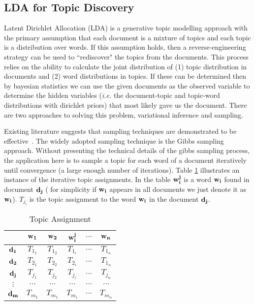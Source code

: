 \documentclass{article}
\begin{document}
\subsection{LDA for Topic Discovery} 
Latent Dirichlet Allocation (LDA) is a generative topic modelling approach with the primary assumption that each document is a mixture of topics and each topic is a distribution over words. If this assumption holds, then a reverse-engineering strategy can be used to ``rediscover" the topics from the documents. This process relies on the ability to calculate the joint distribution of (1) topic distribution in documents and (2) word distributions in topics. If these can be determined then by bayesian statistics we can use the given documents as the observed variable to determine the hidden variables (\emph{i.e.} the document-topic and topic-word distributions with dirichlet priors) that most likely gave us the document. There are two approaches to solving this problem, variational inference and sampling. 

Existing literature suggests that sampling techniques are demonstrated to be effective~\cite{Griffiths04}. The widely adopted sampling technique is the Gibbs sampling approach. Without presenting the technical details of the gibbs sampling process, the application here is to sample a topic for each word of a document iteratively until convergence (a large enough number of iterations). Table \ref{Tab-Ex1} illustrates an instance of the iterative topic assignments. In the table $\bf w^j_i$ is a word $\bf w_i$ found in document $\bf d_j$ ( for simplicity if $\bf w_i$ appears in all documents we just denote it as $\bf w_i$). $T_{j_i}$ is the topic assignment to the word $\bf w_i$ in the document $\bf d_j$.
\begin{table}[htbp]
	\caption[title of table]{Topic Assignment} \label{Tab-Ex1}
	\centering
	
	\begin{tabular}{c|c|c|c|c|c|} %
		 & $\bf w_1$ & $\bf w_2$  & $\bf w^j_i$ & {$\cdots$} & $\bf w_n$  \\ 
		\hline %
	
		$\bf d_1$ & $T_{1_1}$ &$T_{1_2}$ & $T_{1_i}$& $\cdots$ & $T_{1_n}$ \\
		\hline
		$\bf d_2$& $T_{2_1}$ &$T_{2_2}$ & $T_{2_i}$& $\cdots$ & $T_{1_n}$ \\
		\hline
		$\bf d_j$& $T_{j_1}$ &$T_{j_2}$ & $T_{j_i}$& $\cdots$ & $T_{j_n}$ \\
		\hline
		$\vdots$& $\cdots$ &$\cdots$ & $\cdots$& $\cdots$ & $\cdots$ \\
		\hline
		$\bf d_m$& $T_{m_1}$ &$T_{m_1}$ & $T_{m_i}$& $\cdots$ & $T_{m_n}$ \\
		\hline
		
	\end{tabular}
\end{table}
\end{document}
